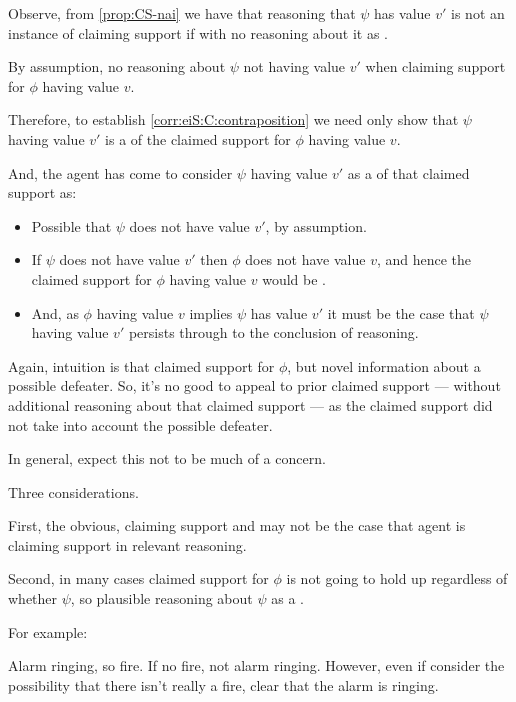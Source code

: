 \begin{note}
  Observe, from \autoref{prop:CS-nai} we have that reasoning that \(\psi\) has value \(v'\) is not an instance of claiming support {\color{red} if \expec{} with no reasoning about it as \expec{}}.

  By assumption, no reasoning about \(\psi\) not having value \(v'\) when claiming support for \(\phi\) having value \(v\).

  Therefore, to establish \autoref{corr:eiS:C:contraposition} we need only show that \(\psi\) having value \(v'\) is a \expec{} of the claimed support for \(\phi\) having value \(v\).

  And, the agent has come to consider \(\psi\) having value \(v'\) as a \requ{} of that claimed support as:
  \begin{itemize}
  \item Possible that \(\psi\) does not have value \(v'\), by assumption.
  \item If \(\psi\) does not have value \(v'\) then \(\phi\) does not have value \(v\), and hence the claimed support for \(\phi\) having value \(v\) would be \misled{}.
  \item And, as \(\phi\) having value \(v\) implies \(\psi\) has value \(v'\) it must be the case that \(\psi\) having value \(v'\) persists through to the conclusion of reasoning.
  \end{itemize}
\end{note}

\begin{note}
  Again, intuition is that claimed support for \(\phi\), but novel information about a possible defeater.
  So, it's no good to appeal to prior claimed support --- without additional reasoning about that claimed support --- as the claimed support did not take into account the possible defeater.
\end{note}

\begin{note}
  In general, expect this not to be much of a concern.

  Three considerations.
\end{note}

\begin{note}
  First, the obvious, claiming support and may not be the case that agent is claiming support in relevant reasoning.
\end{note}


\begin{note}
  Second, in many cases claimed support for \(\phi\) is not going to hold up regardless of whether \(\psi\), so plausible reasoning about \(\psi\) as a \requ{}.

  For example:

  Alarm ringing, so fire.
  If no fire, not alarm ringing.
  However, even if consider the possibility that there isn't really a fire, clear that the alarm is ringing.
\end{note}

